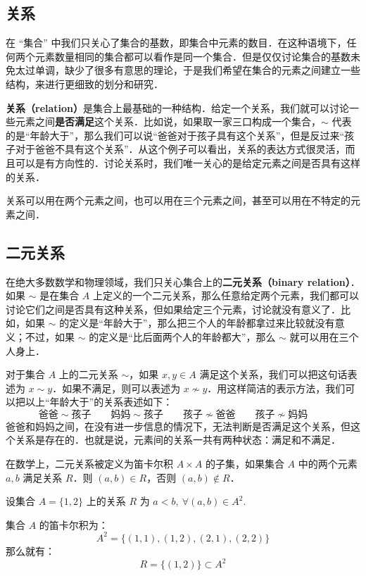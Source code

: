 

\subsection{关系}

在 “集合” 中我们只关心了集合的基数，即集合中元素的数目．在这种语境下，任何两个元素数量相同的集合都可以看作是同一个集合．但是仅仅讨论集合的基数未免太过单调，缺少了很多有意思的理论，于是我们希望在集合的元素之间建立一些结构，来进行更细致的划分和研究．

\textbf{关系（relation）}是集合上最基础的一种结构．给定一个关系，我们就可以讨论一些元素之间\textbf{是否满足}这个关系．比如说，如果取一家三口构成一个集合，$\sim$ 代表的是“年龄大于”，那么我们可以说“爸爸对于孩子具有这个关系”，但是反过来“孩子对于爸爸不具有这个关系”．从这个例子可以看出，关系的表达方式很灵活，而且可以是有方向性的．讨论关系时，我们唯一关心的是给定元素之间是否具有这样的关系．

关系可以用在两个元素之间，也可以用在三个元素之间，甚至可以用在不特定的元素之间．

\subsection{二元关系}

在绝大多数数学和物理领域，我们只关心集合上的\textbf{二元关系（binary relation）}．如果 $\sim$ 是在集合 $A$ 上定义的一个二元关系，那么任意给定两个元素，我们都可以讨论它们之间是否具有这种关系，但如果给定三个元素，讨论就没有意义了．比如，如果 $\sim$ 的定义是“年龄大于”，那么把三个人的年龄都拿过来比较就没有意义；不过，如果 $\sim$ 的定义是“比后面两个人的年龄都大”，那么 $\sim$ 就可以用在三个人身上．

对于集合 $A$ 上的二元关系 $\sim$，如果 $x, y\in A$ 满足这个关系，我们可以把这句话表述为 $x\sim y$．如果不满足，则可以表述为 $x\not\sim y$．用这样简洁的表示方法，我们可以把以上“年龄大于”的关系表述如下：
\begin{equation}
\text{爸爸}\sim\text{孩子} \qquad
\text{妈妈}\sim\text{孩子} \qquad
\text{孩子}\not\sim\text{爸爸} \qquad
\text{孩子}\not\sim\text{妈妈} \qquad
\end{equation}
爸爸和妈妈之间，在没有进一步信息的情况下，无法判断是否满足这个关系，但这个关系是存在的．也就是说，元素间的关系一共有两种状态：满足和不满足．

在数学上，二元关系被定义为笛卡尔积 $A \times A$ 的子集，如果集合 $A$ 中的两个元素 $a,b$ 满足关系 $R$．则 $(a,b) \in R$，否则 $(a,b) \notin R$．
\begin{example}{}
设集合 $A=\{1,2\}$ 上的关系 $R$ 为 $a<b,\ \forall (a,b)\in A^2$.

集合 $A$ 的笛卡尔积为：
\begin{equation}
A^2 = \{(1,1),(1,2),(2,1),(2,2)\}
\end{equation}
那么就有：
\begin{equation}
R=\{(1,2)\}\subset A^2
\end{equation}

\end{example}
